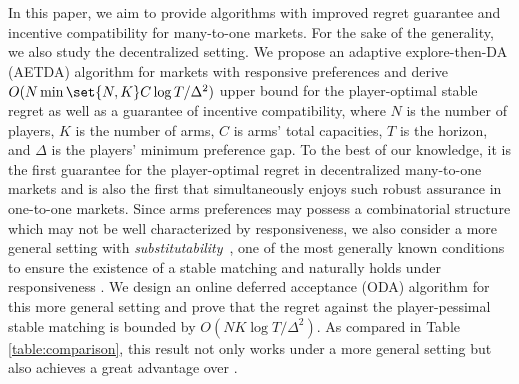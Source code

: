 In this paper, we aim to provide algorithms with improved regret guarantee and incentive compatibility for many-to-one markets. 
For the sake of the generality, we also study the decentralized setting.
We propose an adaptive explore-then-DA (AETDA) algorithm for markets with responsive preferences and derive $O(N\min\set{N,K}C\log T/\Delta^2)$  upper bound for the player-optimal stable regret as well as a guarantee of incentive compatibility, where $N$ is the number of players, $K$ is the number of arms, $C$ is arms' total capacities, $T$ is the horizon, and $\Delta$ is the players' minimum preference gap. 
To the best of our knowledge, it is the first guarantee for the player-optimal regret in decentralized many-to-one markets and is also the first that simultaneously enjoys such robust assurance in one-to-one markets. 
Since arms preferences may possess a combinatorial structure which may not be well characterized by responsiveness, we also consider a more general setting with \textit{substitutability}~\citep{roth1992two}, one of the most generally known conditions to ensure the existence of a stable matching and naturally holds under responsiveness \citep{roth1992two,abdulkadirouglu2005college}.
We design an online deferred acceptance (ODA) algorithm for this more general setting and prove that the regret against the player-pessimal stable matching is bounded by $O(NK\log T/\Delta^2)$.
As compared in Table \ref{table:comparison}, this result not only works under a more general setting but also achieves a great advantage over \citet{wang2022bandit}. 


